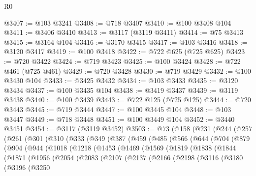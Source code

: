 \begin{lexlean}{R0}
\begin{coremodule}
@3407 := @103 @3241
@3408 := @718 @3407
@3410 := @100 @3408 @104
@3411 := @3406 @3410
@3413 := @3117 (@3119 @3411)
@3414 := @75 @3413
@3415 := @3164 @104
@3416 := @3170 @3415
@3417 := @103 @3416
@3418 := @3120 @3417
@3419 := @100 @3418
@3422 := @722 @625 (@725 @625)
@3423 := @720 @3422
@3424 := @719 @3423
@3425 := @100 @3424
@3428 := @722 @461 (@725 @461)
@3429 := @720 @3428
@3430 := @719 @3429
@3432 := @100 @3430 @104
@3433 := @3425 @3432
@3434 := @103 @3433
@3435 := @3120 @3434
@3437 := @100 @3435 @104
@3438 := @3419 @3437
@3439 := @3119 @3438
@3440 := @100 @3439
@3443 := @722 @125 (@725 @125)
@3444 := @720 @3443
@3445 := @719 @3444
@3447 := @100 @3445 @104
@3448 := @103 @3447
@3449 := @718 @3448
@3451 := @100 @3449 @104
@3452 := @3440 @3451
@3454 := @3117 (@3119 @3452)
@3503 := @73
    (@158
      (@231
        (@244
          (@257
            (@261
              (@301
                (@310
                  (@333
                    (@349
                      (@387
                        (@459
                          (@485
                            (@566
                              (@644
                                (@704
                                  (@879
                                    (@904
                                      (@944
                                        (@1018
                                          (@1218
                                            (@1453
                                              (@1469
                                                (@1569
                                                  (@1819
                                                    (@1838
                                                      (@1844
                                                        (@1871
                                                          (@1956
                                                            (@2054
                                                              (@2083
                                                                (@2107
                                                                  (@2137
                                                                    (@2166
                                                                      (@2198
                                                                        (@3116
                                                                          (@3180
                                                                            (@3196
                                                                              (@3250

\end{coremodule}
\end{lexlean}
